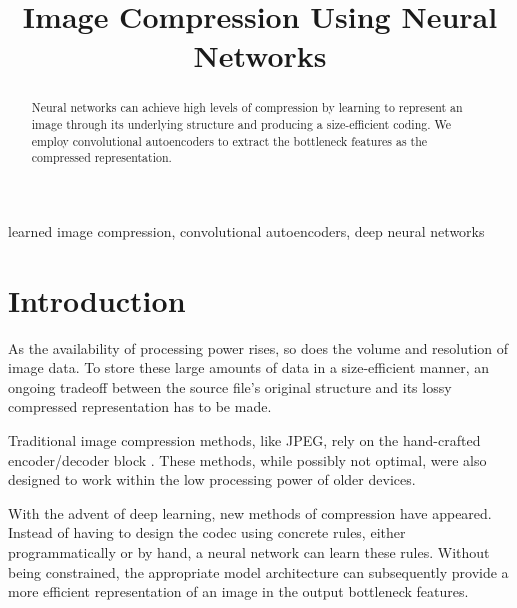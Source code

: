 \documentclass[conference]{IEEEtran}
\begin{document}
\title{Image Compression Using Neural Networks}

\author{
\and
{}
\and
{}
}

\maketitle

\begin{abstract}
Neural networks can achieve high levels of compression by learning to represent an image through its underlying structure and producing a size-efficient coding. We employ convolutional autoencoders to extract the bottleneck features as the compressed representation.
\end{abstract}


\begin{IEEEkeywords}
learned image compression, convolutional autoencoders, deep neural networks
\end{IEEEkeywords}


\section{Introduction}
As the availability of processing power rises, so does the volume and resolution of image data. To store these large amounts of data in a size-efficient manner, an ongoing tradeoff between the source file's original structure and its lossy compressed representation has to be made.

Traditional image compression methods, like JPEG, rely on the hand-crafted encoder/decoder block \cite{cheng_deep_2018}. These methods, while possibly not optimal, were also designed to work within the low processing power of older devices.

With the advent of deep learning, new methods of compression have appeared. Instead of having to design the codec using concrete rules, either programmatically or by hand, a neural network can learn these rules. Without being constrained, the appropriate model architecture can subsequently provide a more efficient representation of an image in the output bottleneck features. 
\end{document}
